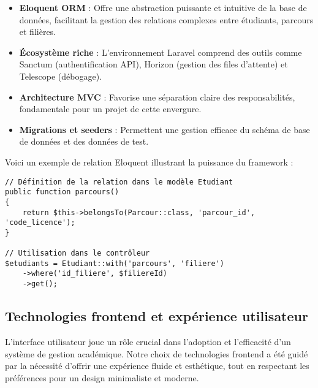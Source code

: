 \documentclass[french,12pt]{report} %
\begin{document}
\begin{itemize}
    \item \textbf{Eloquent ORM} : Offre une abstraction puissante et intuitive de la base de données, facilitant la gestion des relations complexes entre étudiants, parcours et filières.
    
    \item \textbf{Écosystème riche} : L'environnement Laravel comprend des outils comme Sanctum (authentification API), Horizon (gestion des files d'attente) et Telescope (débogage).
    
    \item \textbf{Architecture MVC} : Favorise une séparation claire des responsabilités, fondamentale pour un projet de cette envergure.
    
    \item \textbf{Migrations et seeders} : Permettent une gestion efficace du schéma de base de données et des données de test.
\end{itemize}

Voici un exemple de relation Eloquent illustrant la puissance du framework :

\begin{lstlisting}[style=phpstyle,caption={Relation Eloquent entre étudiant et parcours}]
// Définition de la relation dans le modèle Etudiant
public function parcours()
{
    return $this->belongsTo(Parcour::class, 'parcour_id', 'code_licence');
}

// Utilisation dans le contrôleur
$etudiants = Etudiant::with('parcours', 'filiere')
    ->where('id_filiere', $filiereId)
    ->get();
\end{lstlisting}

\subsection{Technologies frontend et expérience utilisateur}

L'interface utilisateur joue un rôle crucial dans l'adoption et l'efficacité d'un système de gestion académique. Notre choix de technologies frontend a été guidé par la nécessité d'offrir une expérience fluide et esthétique, tout en respectant les préférences pour un design minimaliste et moderne.
\end{document}
